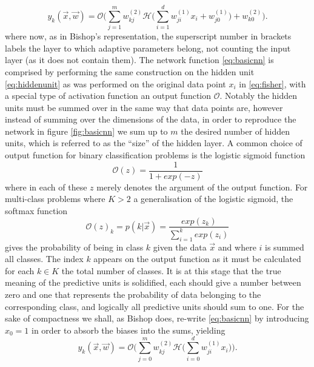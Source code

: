 \begin{equation}
y_k(\vec{x},\vec{w}) = \mathcal{O} \Bigg( \sum_{j=1}^{m} w_{kj}^{(2)}
\mathcal{H} \Bigg( \sum_{i=1}^{d} w_{ji}^{(1)} x_{i} + w_{j0}^{(1)} \Bigg) + w_{k0}^{(2)} \Bigg).
\label{eq:basicnn}
\end{equation}
where now, as in Bishop's representation, the superscript number in brackets
labels the layer to which adaptive parameters belong, not counting the input
layer (as it does not contain them). The network function \eqref{eq:basicnn} is
comprised by performing the same construction on the hidden unit
\eqref{eq:hiddenunit} as was performed on the original data point $x_i$ in
\eqref{eq:fisher}, with a special type of activation function an output function
$\mathcal{O}$. Notably the hidden units must be summed over in the same way that
data points are, however instead of summing over the dimensions of the data, in
order to reproduce the network in figure \ref{fig:basicnn} we sum up to $m$ the
desired number of hidden units, which is referred to as the ``size'' of the
hidden layer. A common choice of output function for binary classification
problems is the logistic sigmoid function
\begin{equation}
\mathcal{O}(z) = \frac{1}{1 + exp(-z)}
\label{eq:sigmoid}
\end{equation}
where in each of these $z$ merely denotes the argument of the output function.
For multi-class problems where $K > 2$ a generalisation of the logistic sigmoid,
the softmax function
\begin{equation}
\mathcal{O}(z)_k = p(k|\vec{x}) = \frac{exp(z_k)}{\sum_{i=1}^kexp(z_i)}
\label{eq:softmax}
\end{equation}
gives the probability of being in class $k$ given the data $\vec{x}$ and
where $i$ is summed all classes. The index $k$ appears on the output function as
it must be calculated for each $k \in K$ the total number of classes. It is at
this stage that the true meaning of the predictive units is solidified, each
should give a number between zero and one that represents the probability of
data belonging to the corresponding class, and logically all predictive units
should sum to one. For the sake of compactness we shall, as Bishop does,
re-write \eqref{eq:basicnn} by introducing $x_{0} = 1$ in order to absorb the
biases into the sums, yielding
\begin{equation}
y_k(\vec{x},\vec{w}) = \mathcal{O} \Bigg( \sum_{j=0}^{m} w_{kj}^{(2)}
\mathcal{H} \Bigg( \sum_{i=0}^{d} w_{ji}^{(1)} x_{i} \Bigg) \Bigg).
\label{eq:compactnn}
\end{equation}

